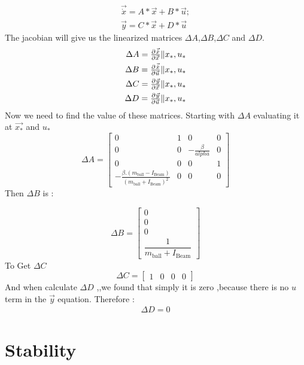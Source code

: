 \documentclass{article}
\begin{document}
\begin{equation}
	\begin{split}
		\vec{\dot{x}} = A*\vec{x} + B*\vec{u};\\
		\vec{y}  = C*\vec{x} + D*\vec{u}
	\end{split}
\end{equation}
The jacobian will give us the linearized matrices $\Delta A$,$\Delta B$,$\Delta C$ and $\Delta D$.
\begin{equation}
	\begin{split}
		\Delta A = \pd{\vec{\dot{x}}}{\vec{x}}\|x_*,u_*\\
		\Delta B = \pd{\vec{\dot{x}}}{\vec{u}}\|x_*,u_*\\
		\Delta C = \pd{\vec{y}}{\vec{x}}\|x_*,u_* \\
		\Delta D = \pd{\vec{y}}{\vec{u}}\|x_*,u_*
	\end{split}
\end{equation}
Now we need to find the value of these matrices.
Starting with $\Delta A$ evaluating it at $\vec{x_*}$ and $u_*$
\begin{equation}
	\Delta A =
	\begin{bmatrix}
		0 &1 &0 &0\\
		0 &0 & -\frac{\beta}{alpha} &0\\
		0 &0 &0 &1 \\
		-\frac{\beta.(m_{\text{ball}} -I_{\text{Beam}} )}{(m_{\text{ball}}+I_\text{Beam})^2} & 0 & 0 & 0
	\end{bmatrix}
\end{equation}
\newpage
Then $\Delta B$ is :

\begin{equation}
	\Delta B =
	\begin{bmatrix}
		0 \\
		0 \\
		0 \\
		\dfrac{1}{m_{\text{ball}} +I_{\text{Beam}} }
	\end{bmatrix}
\end{equation}
To Get $\Delta C $
\begin{equation}
	\Delta C =
	\begin{bmatrix}
		1 & 0 & 0 & 0
	\end{bmatrix}
\end{equation}
And when calculate $\Delta D $ ,,we found that simply it is zero ,because there is no $u$ term in the $\vec{y}$ equation.
Therefore :
\begin{equation}
	\begin{split}
		\Delta D = 0
	\end{split}
\end{equation}

\newpage
\section{Stability}
\end{document}

